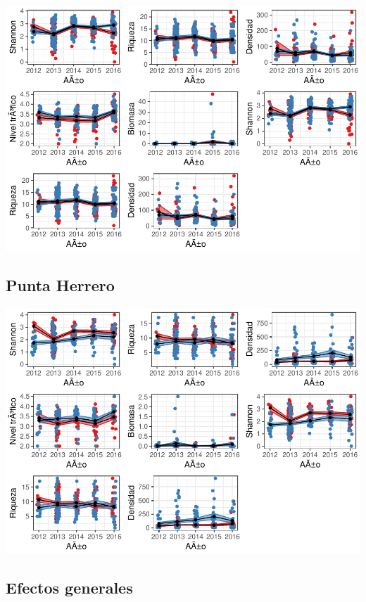 \documentclass[12pt,]{article}
\begin{document}
\includegraphics{Manuscript_files/figure-latex/unnamed-chunk-10-1.pdf}

\subsection{Punta Herrero}\label{punta-herrero}

\includegraphics{Manuscript_files/figure-latex/unnamed-chunk-11-1.pdf}

\subsection{Efectos generales}\label{efectos-generales}
\end{document}
